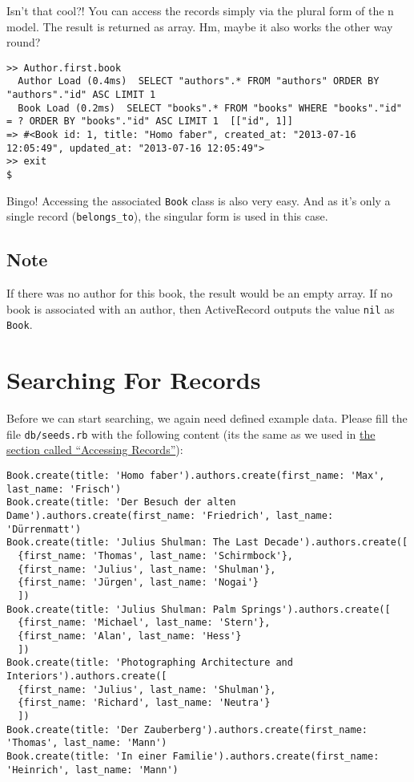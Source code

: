\documentclass[a4paper]{book}
\begin{document}
Isn't that cool?! You can access the records simply via the plural form of the n model. The result is returned as array. Hm, maybe it also works the other way round?

\begin{shaded}\begin{verbatim}
>> Author.first.book
  Author Load (0.4ms)  SELECT "authors".* FROM "authors" ORDER BY "authors"."id" ASC LIMIT 1
  Book Load (0.2ms)  SELECT "books".* FROM "books" WHERE "books"."id" = ? ORDER BY "books"."id" ASC LIMIT 1  [["id", 1]]
=> #<Book id: 1, title: "Homo faber", created_at: "2013-07-16 12:05:49", updated_at: "2013-07-16 12:05:49">
>> exit
$
\end{verbatim}\end{shaded}

Bingo! Accessing the associated \texttt{Book} class is also very easy. And as it's only a single record (\texttt{belongs\_to}), the singular form is used in this case.

\subsection{Note}\label{note-26}

If there was no author for this book, the result would be an empty array. If no book is associated with an author, then ActiveRecord outputs the value \texttt{nil} as \texttt{Book}.

\section{Searching For Records}\label{searching-for-records}

Before we can start searching, we again need defined example data. Please fill the file \texttt{db/seeds.rb} with the following content (its the same as we used in \hyperref[activerecordux5f1nux5fzugreifen]{the section called “Accessing Records”}):

\begin{shaded}\begin{verbatim}
Book.create(title: 'Homo faber').authors.create(first_name: 'Max', last_name: 'Frisch')
Book.create(title: 'Der Besuch der alten Dame').authors.create(first_name: 'Friedrich', last_name: 'Dürrenmatt')
Book.create(title: 'Julius Shulman: The Last Decade').authors.create([
  {first_name: 'Thomas', last_name: 'Schirmbock'},
  {first_name: 'Julius', last_name: 'Shulman'},
  {first_name: 'Jürgen', last_name: 'Nogai'}
  ])
Book.create(title: 'Julius Shulman: Palm Springs').authors.create([
  {first_name: 'Michael', last_name: 'Stern'},
  {first_name: 'Alan', last_name: 'Hess'}
  ])
Book.create(title: 'Photographing Architecture and Interiors').authors.create([
  {first_name: 'Julius', last_name: 'Shulman'},
  {first_name: 'Richard', last_name: 'Neutra'}
  ])
Book.create(title: 'Der Zauberberg').authors.create(first_name: 'Thomas', last_name: 'Mann')
Book.create(title: 'In einer Familie').authors.create(first_name: 'Heinrich', last_name: 'Mann')
\end{verbatim}\end{shaded}
\end{document}
